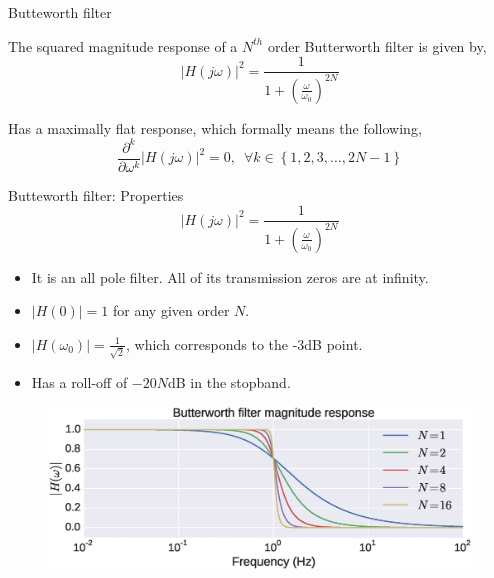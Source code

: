 \documentclass{beamer}
\begin{document}
\begin{frame}{Butteworth filter}

The squared magnitude response of a $N^{th}$ order Butterworth filter is given by,
\[ \left|H(j\omega)\right|^2 = \frac{1}{1+\left(\frac{\omega}{\omega_0}\right)^{2N}}  \]

Has a maximally flat response, which formally means the following,
\[ \frac{\partial^k}{\partial\omega^k}\left|H(j\omega)\right|^2 = 0, \,\,\, \forall k \in \left\{1,2,3, \ldots, 2N-1 \right\}\]

\end{frame}

\begin{frame}{Butteworth filter: Properties}
\[ \left|H(j\omega)\right|^2 = \frac{1}{1+\left(\frac{\omega}{\omega_0}\right)^{2N}}  \]

\begin{itemize}
\item It is an all pole filter. All of its transmission zeros are at infinity.
\item $\left|H(0)\right| = 1$ for any given order $N$.
\item $\left|H(\omega_0)\right| = \frac{1}{\sqrt{2}}$, which corresponds to the -3dB point.
\item Has a roll-off of $-20N$dB in the stopband.
\end{itemize}
\vspace{-2mm}

\begin{figure}
\centering
\includegraphics[width=\textwidth]{img/butter.eps}
\end{figure}
\end{frame}
\end{document}
